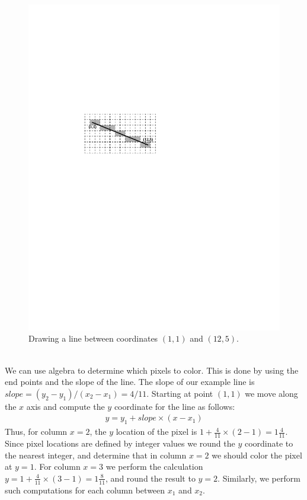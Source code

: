 \documentclass[epsfig,10pt,fullpage]{article}
\begin{document}
\begin{figure}[h!]
   \begin{center}
			  \includegraphics[scale=0.8]{figures/fig_line_drawing}
   \end{center}
   \caption{Drawing a line between coordinates $(1,1)$ and $(12,5)$.}
	\label{fig:line_drawing}
\end{figure}

~\\
\noindent
We can use algebra to determine which pixels to color. This is done by using the end points and 
the slope of the line. The slope of our example line is $slope = (y_2 - y_1)/(x_2 - x_1) = 4/11$. 
Starting at point $(1,1)$ we move along the $x$ axis and compute the $y$ coordinate for the 
line as follows:
\begin{eqnarray*}
y = y_1 + slope \times (x - x_1)
\end{eqnarray*}
\noindent
Thus, for column $x = 2$, the $y$ location of the pixel is
$1 + \frac{4}{11} \times (2-1) = 1 \frac{4}{11}$. 
Since pixel locations are defined by integer values we round the $y$ coordinate to the nearest 
integer, and determine that in column $x = 2$ we should color the pixel at $y = 1$. For
column $x = 3$ we perform the calculation $y = 1 + \frac{4}{11} \times (3-1) = 1
\frac{8}{11}$, and round the result to $y = 2$.  Similarly, we perform such computations 
for each column between $x_1$ and $x_2$.
\end{document}

